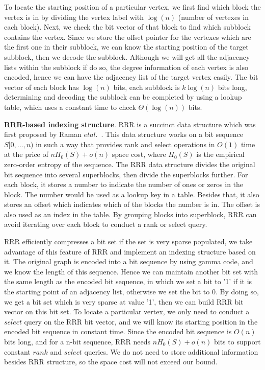 \documentclass[12pt,glossary]{dalthesis}
\begin{document}
\bigskip

To locate the starting position of a particular vertex, we first find which block the vertex is in by dividing the vertex label with $\log(n)$ (number of vertexes in each block). Next, we check the bit vector of that block to find which subblock contains the vertex. Since we store the offset pointer for the vertexes which are the first one in their subblock, we can know the starting position of the target subblock, then we decode the subblock. Although we will get all the adjacency lists within the subblock if do so, the degree information of each vertex is also encoded, hence we can have the adjacency list of the target vertex easily. The bit vector of each block has $\log(n)$ bits, each subblock is $k\log(n)$ bits long, determining and decoding the subblock can be completed by using a lookup table, which uses a constant time to check $\Theta(\log(n))$ bits.              

\bigskip
\bigskip

\textbf{RRR-based indexing structure}. RRR is a succinct data structure which was first proposed by Raman $et al$.~\cite{RRR}. This data structure works on a bit sequence $S[0,...,n)$ in such a way that provides rank and select operations in $O(1)$ time at the price of $nH_{0}(S)+o(n)$ space cost, where $H_{0}(S)$ is the empirical zero-order entropy of the sequence. The RRR data structure divides the original bit sequence into several superblocks, then divide the superblocks further. For each block, it stores a number to indicate the number of ones or zeros in the block. The number would be used as a lookup key in a table. Besides that, it also stores an offset which indicates which of the blocks the number is in. The offset is also used as an index in the table. By grouping blocks into superblock, RRR can avoid iterating over each block to conduct a rank or select query. 

\bigskip
\bigskip

RRR efficiently compresses a bit set if the set is very sparse populated, we take advantage of this feature of RRR and implement an indexing structure based on it. The original graph is encoded into a bit sequence by using gamma code, and we know the length of this sequence. Hence we can maintain another bit set with the same length as the encoded bit sequence, in which we set a bit to '1' if it is the starting point of an adjacency list, otherwise we set the bit to 0. By doing so, we get a bit set which is very sparse at value '1', then we can build RRR bit vector on this bit set. To locate a particular vertex, we only need to conduct a $select$ query on the RRR bit vector, and we will know its starting position in the encoded bit sequence in constant time. Since the encoded bit sequence is $O(n)$ bits long, and for a n-bit sequence, RRR needs $nH_{0}(S)+o(n)$ bits to support constant $rank$ and $select$ queries. We do not need to store additional information besides RRR structure, so the space cost will not exceed our bound. 
\end{document}

